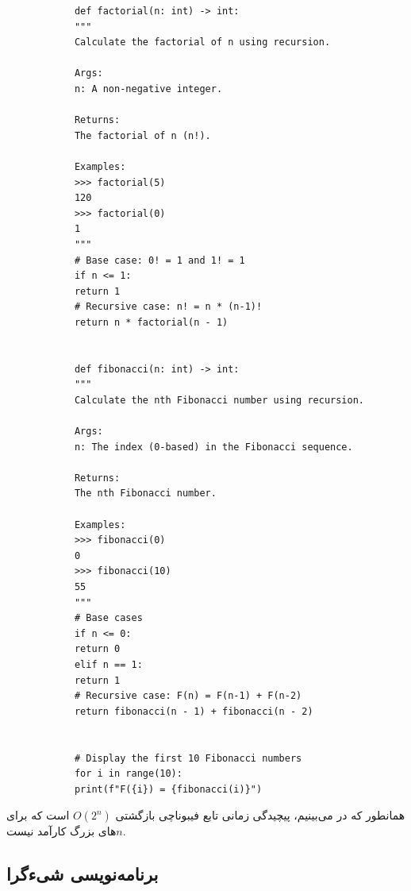 \documentclass{matinbook}
\begin{document}
    \begin{latin}
        \begin{verbatim}
            def factorial(n: int) -> int:
            """
            Calculate the factorial of n using recursion.
            
            Args:
            n: A non-negative integer.
            
            Returns:
            The factorial of n (n!).
            
            Examples:
            >>> factorial(5)
            120
            >>> factorial(0)
            1
            """
            # Base case: 0! = 1 and 1! = 1
            if n <= 1:
            return 1
            # Recursive case: n! = n * (n-1)!
            return n * factorial(n - 1)
            
            
            def fibonacci(n: int) -> int:
            """
            Calculate the nth Fibonacci number using recursion.
            
            Args:
            n: The index (0-based) in the Fibonacci sequence.
            
            Returns:
            The nth Fibonacci number.
            
            Examples:
            >>> fibonacci(0)
            0
            >>> fibonacci(10)
            55
            """
            # Base cases
            if n <= 0:
            return 0
            elif n == 1:
            return 1
            # Recursive case: F(n) = F(n-1) + F(n-2)
            return fibonacci(n - 1) + fibonacci(n - 2)
            
            
            # Display the first 10 Fibonacci numbers
            for i in range(10):
            print(f"F({i}) = {fibonacci(i)}")
        \end{verbatim}
    \end{latin}
    \label{code:recursion}
    
    همانطور که در  می‌بینیم،
    پیچیدگی زمانی تابع فیبوناچی بازگشتی $O(2^{n})$ است
    که برای $n$های بزرگ کارآمد نیست.
    
    \subsection{برنامه‌نویسی شیءگرا}
    
\end{document}
